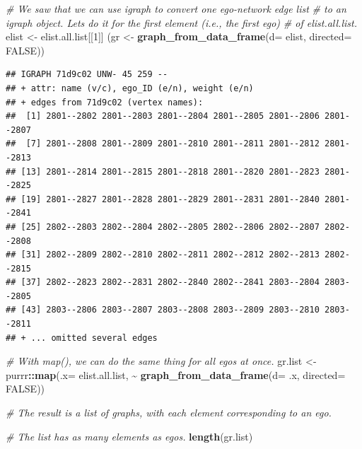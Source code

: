 \documentclass[
]{book}
\newenvironment{Shaded}{\begin{snugshade}}{\end{snugshade}}
\newcommand{\AttributeTok}[1]{\textcolor[rgb]{0.13,0.29,0.53}{#1}}
\newcommand{\CommentTok}[1]{\textcolor[rgb]{0.56,0.35,0.01}{\textit{#1}}}
\newcommand{\ConstantTok}[1]{\textcolor[rgb]{0.56,0.35,0.01}{#1}}
\newcommand{\DecValTok}[1]{\textcolor[rgb]{0.00,0.00,0.81}{#1}}
\newcommand{\FunctionTok}[1]{\textcolor[rgb]{0.13,0.29,0.53}{\textbf{#1}}}
\newcommand{\NormalTok}[1]{#1}
\newcommand{\OtherTok}[1]{\textcolor[rgb]{0.56,0.35,0.01}{#1}}
\newcommand{\SpecialCharTok}[1]{\textcolor[rgb]{0.81,0.36,0.00}{\textbf{#1}}}
\begin{document}
\begin{Shaded}
\begin{Highlighting}[]
\CommentTok{\# We saw that we can use igraph to convert one ego{-}network edge list}
\CommentTok{\# to an igraph object. Let\textquotesingle{}s do it for the first element (i.e., the first ego)}
\CommentTok{\# of elist.all.list.}
\NormalTok{elist }\OtherTok{\textless{}{-}}\NormalTok{ elist.all.list[[}\DecValTok{1}\NormalTok{]]}
\NormalTok{(gr }\OtherTok{\textless{}{-}} \FunctionTok{graph\_from\_data\_frame}\NormalTok{(}\AttributeTok{d=}\NormalTok{ elist, }\AttributeTok{directed=} \ConstantTok{FALSE}\NormalTok{))}
\end{Highlighting}
\end{Shaded}

\begin{verbatim}
## IGRAPH 71d9c02 UNW- 45 259 -- 
## + attr: name (v/c), ego_ID (e/n), weight (e/n)
## + edges from 71d9c02 (vertex names):
##  [1] 2801--2802 2801--2803 2801--2804 2801--2805 2801--2806 2801--2807
##  [7] 2801--2808 2801--2809 2801--2810 2801--2811 2801--2812 2801--2813
## [13] 2801--2814 2801--2815 2801--2818 2801--2820 2801--2823 2801--2825
## [19] 2801--2827 2801--2828 2801--2829 2801--2831 2801--2840 2801--2841
## [25] 2802--2803 2802--2804 2802--2805 2802--2806 2802--2807 2802--2808
## [31] 2802--2809 2802--2810 2802--2811 2802--2812 2802--2813 2802--2815
## [37] 2802--2823 2802--2831 2802--2840 2802--2841 2803--2804 2803--2805
## [43] 2803--2806 2803--2807 2803--2808 2803--2809 2803--2810 2803--2811
## + ... omitted several edges
\end{verbatim}

\begin{Shaded}
\begin{Highlighting}[]
\CommentTok{\# With map(), we can do the same thing for all egos at once.}
\NormalTok{gr.list }\OtherTok{\textless{}{-}}\NormalTok{ purrr}\SpecialCharTok{::}\FunctionTok{map}\NormalTok{(}\AttributeTok{.x=}\NormalTok{ elist.all.list, }
                      \SpecialCharTok{\textasciitilde{}} \FunctionTok{graph\_from\_data\_frame}\NormalTok{(}\AttributeTok{d=}\NormalTok{ .x, }\AttributeTok{directed=} \ConstantTok{FALSE}\NormalTok{))}

\CommentTok{\# The result is a list of graphs, with each element corresponding to an ego.}

\CommentTok{\# The list has as many elements as egos.}
\FunctionTok{length}\NormalTok{(gr.list)}
\end{Highlighting}
\end{Shaded}
\end{document}

